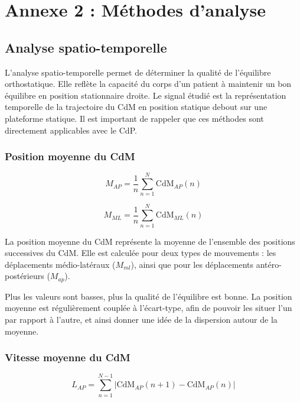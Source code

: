 \newpage
\section{Annexe 2 : Méthodes d'analyse}

\subsection{Analyse spatio-temporelle}

L'analyse spatio-temporelle permet de déterminer la qualité de l'équilibre orthostatique. 
Elle reflète la capacité du corps d'un patient à maintenir un bon équilibre en position stationnaire droite. 
Le signal étudié est la représentation temporelle de la trajectoire du CdM en position statique debout sur une plateforme statique. 
Il est important de rappeler que ces méthodes sont directement applicables avec le CdP.

\subsubsection{Position moyenne du CdM}

\begin{equation}
  M_{AP} = \frac{1}{n} \sum_{n=1}^N \mbox{CdM}_{AP}(n) 
  \label{eq:M_AP}
\end{equation}

\begin{equation}
  M_{ML} = \frac{1}{n} \sum_{n=1}^N \mbox{CdM}_{ML}(n) 
  \label{eq:M_ML}
\end{equation}

La position moyenne du CdM représente la moyenne de l'ensemble des positions successives du CdM. 
Elle est calculée pour deux types de mouvements : les déplacements médio-latéraux ($M_{ml}$), ainsi que pour les déplacements antéro-postérieurs ($M_{ap}$).

Plus les valeurs sont basses, plus la qualité de l'équilibre est bonne.
La position moyenne est régulièrement couplée à l'écart-type, afin de pouvoir les situer l'un par rapport à l'autre, et ainsi donner une idée de la dispersion autour de la moyenne.

\subsubsection{Vitesse moyenne du CdM}

\begin{equation}
  L_{AP} = \sum_{n=1}^{N-1} \left| \mbox{CdM}_{AP}(n+1) - \mbox{CdM}_{AP}(n) \right|
  \label{eq:L_AP}
\end{equation}

